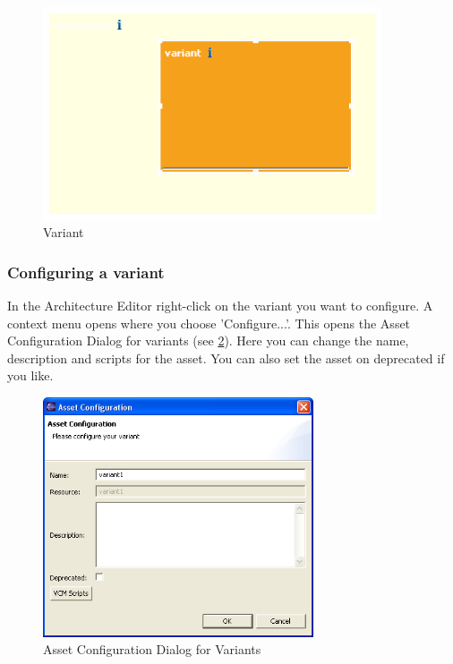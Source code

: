 \begin{figure}[h!]
\begin{center}
\includegraphics[width=10cm]{variant.png}
   \caption{Variant}
\label{variant}
\end{center}
\end{figure}\par


\subsubsection{Configuring a variant}
In the Architecture Editor right-click on the variant you want to configure. 
A context menu opens where you choose 'Configure...'. This opens the Asset Configuration Dialog
for variants (see \ref{configvar}). Here you can change the name, description and scripts for the
asset. You can also set the asset on deprecated if you like.

\begin{figure}[h!]
\begin{center}
\includegraphics[width=8cm]{configvar.png}
   \caption{Asset Configuration Dialog for Variants}
\label{configvar}
\end{center}
\end{figure}\par

